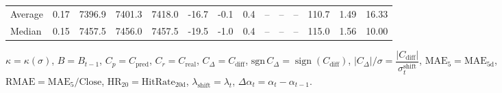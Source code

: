 \begin{threeparttable}
{\begin{tabular}{lrrrrrrrrrrrrr}
Average &     0.17 & 7396.9 & 7401.3 & 7418.0 &      -16.7 &                     -0.1 &                 0.4 &         -- &        -- &             -- &            110.7 &            1.49 &                  16.33 \\
 Median &     0.15 & 7457.5 & 7456.0 & 7457.5 &      -19.5 &                     -1.0 &                 0.4 &         -- &        -- &             -- &            115.0 &            1.56 &                  10.00 \\
\bottomrule
\end{tabular}
}
\begin{tablenotes}\footnotesize
\item $\kappa=\kappa(\sigma)$, $B=B_{t-1}$, $C_p=C_{\text{pred}}$, $C_r=C_{\text{real}}$, $C_\Delta=C_{\text{diff}}$, $\mathrm{sgn}\,C_\Delta=\operatorname{sign}(C_{\text{diff}})$, $|C_\Delta|/\sigma=\dfrac{|C_{\text{diff}}|}{\sigma_t^{\text{shift}}}$, $\mathrm{MAE}_5=\mathrm{MAE}_{5\text{d}}$, $\mathrm{RMAE}= \mathrm{MAE}_5 / \text{Close}$, $\mathrm{HR}_{20}=\mathrm{HitRate}_{20\text{d}}$, 
$\lambda_{\text{shift}}=\lambda_t$, 
$\Delta\alpha_t=\alpha_t-\alpha_{t-1}$.
\end{tablenotes}
\end{threeparttable}
\endgroup
